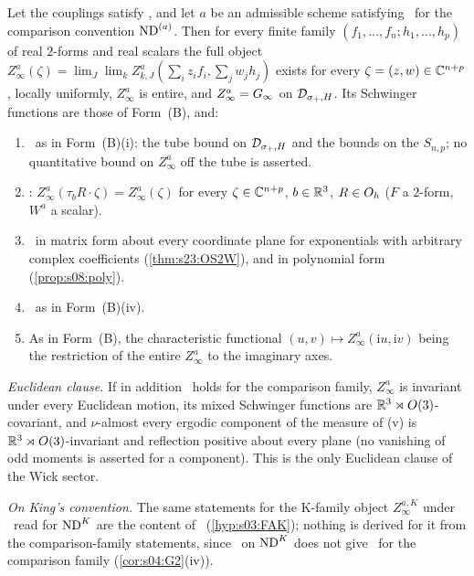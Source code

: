 \begin{theorem}\label{thm:s23:FormA}
Let the couplings satisfy \Tthree, and let $a$ be an admissible scheme satisfying \Wtwo\ for the comparison convention $\mathrm{ND}^{(a)}$. Then for every finite family $(f_1,\dots,f_n;h_1,\dots,h_p)$ of real $2$-forms and real scalars the full object $Z^a_\infty(\zeta)=\lim_J\lim_kZ^a_{k,J}(\sum_iz_if_i,\sum_jw_jh_j)$ exists for every $\zeta=(z,w)\in\mathbb C^{n+p}$, locally uniformly, $Z^a_\infty$ is entire, and $Z^a_\infty=G_\infty$ on $\mathcal D_{\sigma_+,H}$. Its Schwinger functions are those of Form~(B), and:
\begin{enumerate}[label=\textup{(\roman*)},leftmargin=*,nosep]
\item \OSz\ as in Form~(B)(i): the tube bound on $\mathcal D_{\sigma_+,H}$ and the bounds on the $S_{n,p}$; no quantitative bound on $Z^a_\infty$ off the tube is asserted.
\item \OSo: $Z^a_\infty(\tau_bR\cdot\zeta)=Z^a_\infty(\zeta)$ for every $\zeta\in\mathbb C^{n+p}$, $b\in\mathbb R^3$, $R\in O_h$ ($F$ a $2$-form, $W^a$ a scalar).
\item \OSt\ in matrix form about every coordinate plane for exponentials with arbitrary complex coefficients (\cref{thm:s23:OS2W}), and in polynomial form (\cref{prop:s08:poly}).
\item \OSth\ as in Form~(B)(iv).
\item[\textup{(v),(vi)}] As in Form~(B), the characteristic functional $(u,v)\mapsto Z^a_\infty(\mathrm iu,\mathrm iv)$ being the restriction of the entire $Z^a_\infty$ to the imaginary axes.
\end{enumerate}
\emph{Euclidean clause.} If in addition \RW\ holds for the comparison family, $Z^a_\infty$ is invariant under every Euclidean motion, its mixed Schwinger functions are $\mathbb R^3\rtimes O(3)$-covariant, and $\nu$-almost every ergodic component of the measure of (v) is $\mathbb R^3\rtimes O(3)$-invariant and reflection positive about every plane (no vanishing of odd moments is asserted for a component). This is the only Euclidean clause of the Wick sector.

\emph{On King's convention.} The same statements for the K-family object $Z^{a,K}_\infty$ under \Wtwo\ read for $\mathrm{ND}^{K}$ are the content of \FAK\ (\cref{hyp:s03:FAK}); nothing is derived for it from the comparison-family statements, since \Wtwo\ on $\mathrm{ND}^{K}$ does not give \Wtwo\ for the comparison family (\cref{cor:s04:G2}(iv)).
\end{theorem}

